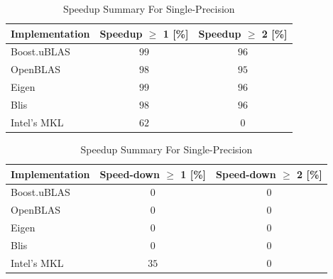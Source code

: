 \begin{table}[ht]
    \centering
    \caption{Speedup Summary For Single-Precision}
    \begin{tabular}{|l|c|c|}
        \hline
        \textbf{Implementation} & \textbf{Speedup $\geq$ 1 [\%]} & \textbf{Speedup $\geq$ 2 [\%]}\\
        \hline
        Boost.uBLAS & $99$ & $96$ \\
        \hline
        OpenBLAS    & $98$ & $95$ \\
        \hline
        Eigen       & $99$ & $96$ \\
        \hline
        Blis        & $98$ & $96$ \\
        \hline
        Intel's MKL & $62$ & $0$ \\
        \hline
    \end{tabular}

    \begin{tabular}{|l|c|c|}
        \hline
        \textbf{Implementation} & \textbf{Speed-down $\geq$ 1 [\%]} & \textbf{Speed-down $\geq$ 2 [\%]}\\
        \hline
        Boost.uBLAS & $0$ & $0$ \\
        \hline
        OpenBLAS    & $0$ & $0$ \\
        \hline
        Eigen       & $0$ & $0$ \\
        \hline
        Blis        & $0$ & $0$ \\
        \hline
        Intel's MKL & $35$ & $0$ \\
        \hline
    \end{tabular}
\end{table}

